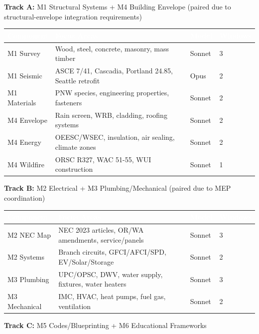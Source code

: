 \documentclass[11pt,letterpaper]{article}
\newcommand{\tableheader}[1]{\textbf{\sffamily\textcolor{white}{#1}}}
\begin{document}
\textbf{Track A:} M1 Structural Systems + M4 Building Envelope (paired due to structural-envelope integration requirements)

\begin{center}
\begin{tabularx}{\textwidth}{L{2.5cm}XC{1.5cm}C{1.5cm}}
\toprule
{}
\tableheader{Component} & \tableheader{Focus Areas} & \tableheader{Model} & \tableheader{Windows} \\
\midrule
M1 Survey & Wood, steel, concrete, masonry, mass timber & Sonnet & 3 \\
M1 Seismic & ASCE 7/41, Cascadia, Portland 24.85, Seattle retrofit & Opus & 2 \\
M1 Materials & PNW species, engineering properties, fasteners & Sonnet & 2 \\
M4 Envelope & Rain screen, WRB, cladding, roofing systems & Sonnet & 2 \\
M4 Energy & OEESC/WSEC, insulation, air sealing, climate zones & Sonnet & 2 \\
M4 Wildfire & ORSC R327, WAC 51-55, WUI construction & Sonnet & 1 \\
\bottomrule
\end{tabularx}
\end{center}

\textbf{Track B:} M2 Electrical + M3 Plumbing/Mechanical (paired due to MEP coordination)

\begin{center}
\begin{tabularx}{\textwidth}{L{2.5cm}XC{1.5cm}C{1.5cm}}
\toprule
{}
\tableheader{Component} & \tableheader{Focus Areas} & \tableheader{Model} & \tableheader{Windows} \\
\midrule
M2 NEC Map & NEC 2023 articles, OR/WA amendments, service/panels & Sonnet & 3 \\
M2 Systems & Branch circuits, GFCI/AFCI/SPD, EV/Solar/Storage & Sonnet & 2 \\
M3 Plumbing & UPC/OPSC, DWV, water supply, fixtures, water heaters & Sonnet & 3 \\
M3 Mechanical & IMC, HVAC, heat pumps, fuel gas, ventilation & Sonnet & 2 \\
\bottomrule
\end{tabularx}
\end{center}

\textbf{Track C:} M5 Codes/Blueprinting + M6 Educational Frameworks
\end{document}
